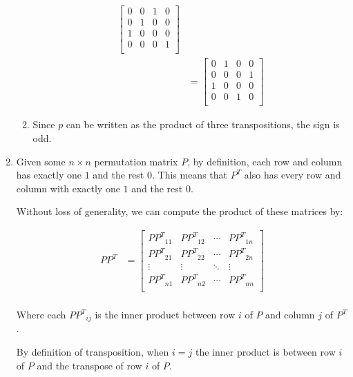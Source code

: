 \documentclass[12pt,letterpaper]{article}
\begin{document}
\begin{enumerate}
\begin{enumerate}
\begin{align*}
              \begin{bmatrix}
                0 & 0 & 1 & 0 \\
                0 & 1 & 0 & 0 \\
                1 & 0 & 0 & 0 \\
                0 & 0 & 0 & 1 \\
              \end{bmatrix} \\
            &=
              \begin{bmatrix}
                0 & 1 & 0 & 0 \\
                0 & 0 & 0 & 1 \\
                1 & 0 & 0 & 0 \\
                0 & 0 & 1 & 0 \\
              \end{bmatrix}
          \end{align*}
        \item
          Since $p$ can be written as the product of three transpositions, the sign is odd.
      \end{enumerate}
    \item
      Given some $n \times n$ permutation matrix $P$, by definition, each row and column has exactly one $1$ and the rest $0$.
      This means that $P^T$ also has every row and column with exactly one $1$ and the rest $0$.

      Without loss of generality, we can compute the product of these matrices by:

      \begin{align*}
        PP^T &=
          \begin{bmatrix}
            {PP^T}_{1 1} & {PP^T}_{1 2} & \cdots & {PP^T}_{1 n} \\
            {PP^T}_{2 1} & {PP^T}_{2 2} & \cdots & {PP^T}_{2 n} \\
            \vdots       & \vdots       & \ddots & \vdots       \\
            {PP^T}_{n 1} & {PP^T}_{n 2} & \cdots & {PP^T}_{n n} \\
          \end{bmatrix}\\
      \end{align*}

      Where each ${PP^T}_{i j}$ is the inner product between row $i$ of $P$ and column $j$ of $P^T$.

      By definition of transposition, when $i = j$ the inner product is between row $i$ of $P$ and the transpose of row $i$ of $P$.


\end{enumerate}
\end{document}
